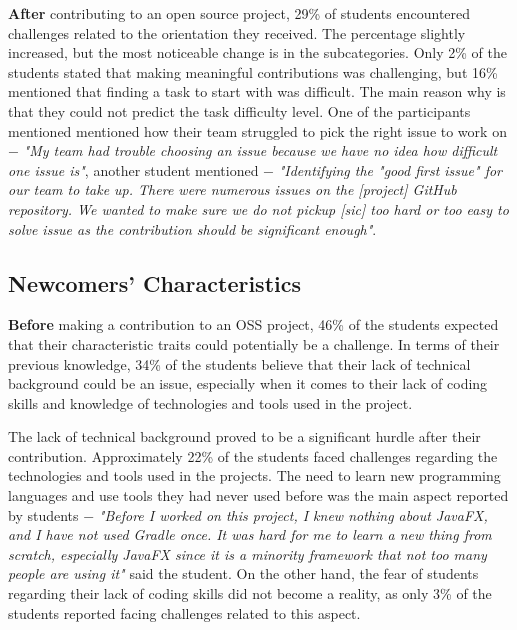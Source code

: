 \documentclass[sigconf]{acmart}
\begin{document}
\begin{sloppy}
\textbf{After} contributing to an open source project, 29\% of students encountered challenges related to the orientation they received. The percentage slightly increased, but the most noticeable change is in the subcategories. Only 2\% of the students stated that making meaningful contributions was challenging, but 16\% mentioned that finding a task to start with was difficult. The main reason why is that they could not predict the task difficulty level. 
One of the participants mentioned mentioned how their team struggled to pick the right issue to work on $-$ \textit{"My team had trouble choosing an issue because we have no idea how difficult one issue is"}, another student mentioned $-$ \textit{"Identifying the "good first issue" for our team to take up. There were numerous issues on the [project] GitHub repository. We wanted to make sure we do not pickup [sic] too hard or too easy to solve issue as the contribution should be significant enough"}.



\subsection{Newcomers' Characteristics}

\textbf{Before} making a contribution to an OSS project, 46\% of the students expected that their characteristic traits could potentially be a challenge. In terms of their previous knowledge, 34\% of the students believe that their lack of technical background could be an issue, especially when it comes to their lack of coding skills and knowledge of technologies and tools used in the project.

The lack of technical background proved to be a significant hurdle after their contribution. Approximately 22\% of the students faced challenges regarding the technologies and tools used in the projects. The need to learn new programming languages and use tools they had never used before was the main aspect reported by students $-$ \textit{"Before I worked on this project, I knew nothing about JavaFX, and I have not used Gradle once. It was hard for me to learn a new thing from scratch, especially JavaFX since it is a minority framework that not too many people are using it"} said the student. On the other hand, the fear of students regarding their lack of coding skills did not become a reality, as only 3\% of the students reported facing challenges related to this aspect.


\end{sloppy}
\end{document}
